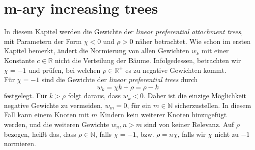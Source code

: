 
\chapter{m-ary increasing trees}
In diesem Kapitel werden die Gewichte der \textit{linear preferential attachment trees}, mit Parametern der Form $\chi < 0$ und $\rho > 0$ näher betrachtet. Wie schon im ersten Kapitel bemerkt, ändert die Normierung von allen Gewichten $w_k$ mit einer Konstante $c \in \mathbb{R}$ nicht die Verteilung der Bäume. Infolgedessen, betrachten wir $\chi = -1$ und prüfen, bei welchen $\rho \in \mathbb{R}^{+}$ es zu negative Gewichten kommt.\\
Für $\chi = -1$ sind die Gewichte der \textit{linear preferential trees} durch 
\[
    w_k = \chi k + \rho =  \rho - k 
\]
festgelegt. Für $k > \rho$ folgt daraus, dass $w_k < 0$. Daher ist die einzige Möglichkeit negative Gewichte zu vermeiden, $w_m = 0$, für ein $m \in \mathbb{N}$ sicherzustellen. In diesem Fall kann einem Knoten mit $m$ Kindern kein weiterer Knoten hinzugefügt werden, und die weiteren Gewichte $w_n, n > m$ sind von keiner Relevanz. Auf $\rho$ bezogen, heißt das, dass $\rho \in \mathbb{N}$, falls $\chi = -1$, bzw. $\rho= n\chi$, falls wir $\chi$ nicht zu $-1$ normieren.  
